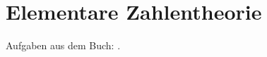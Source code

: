 \part{Elementare Zahlentheorie}
Aufgaben aus dem Buch: .


\newpage

\newpage

\newpage

\newpage

\newpage

\newpage

